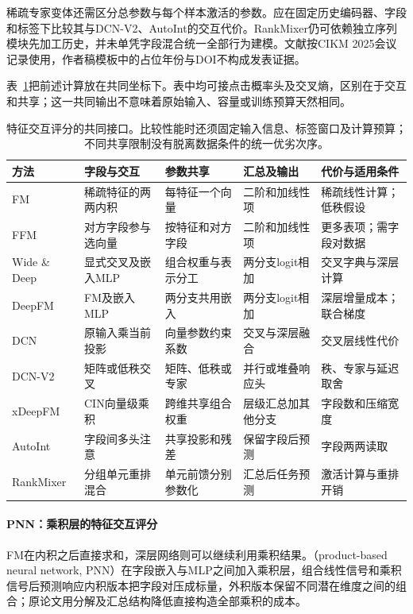 稀疏专家变体还需区分总参数与每个样本激活的参数。应在固定历史编码器、字段和标签下比较其与DCN-V2、AutoInt的交互代价。RankMixer仍可依赖独立序列模块先加工历史，并未单凭字段混合统一全部行为建模。文献按CIKM 2025会议记录使用，作者稿模板中的占位年份与DOI不构成发表证据。

表~\ref{tab:rs-feature-models}把前述计算放在共同坐标下。表中均可接点击概率头及交叉熵，区别在于交互和共享；这一共同输出不意味着原始输入、容量或训练预算天然相同。
\begin{table}[htbp]
 \centering\small
 \begin{tabularx}{\linewidth}{@{}lXXXX@{}}
 \toprule
 方法 & 字段与交互 & 参数共享 & 汇总及输出 & 代价与适用条件\\
 \midrule
 FM & 稀疏特征的两两内积 & 每特征一个向量 & 二阶和加线性项 & 稀疏线性计算；低秩假设\\
 FFM & 对方字段参与选向量 & 按特征和对方字段 & 二阶和加线性项 & 更多表项；需字段对数据\\
 Wide \& Deep & 显式交叉及嵌入MLP & 组合权重与表示分工 & 两分支logit相加 & 交叉字典与深层计算\\
 DeepFM & FM及嵌入MLP & 两分支共用嵌入 & 两分支logit相加 & 深层增量成本；联合梯度\\
 DCN & 原输入乘当前投影 & 向量参数约束系数 & 交叉与深层融合 & 交叉层线性代价\\
 DCN-V2 & 矩阵或低秩交叉 & 矩阵、低秩或专家 & 并行或堆叠响应头 & 秩、专家与延迟取舍\\
 xDeepFM & CIN向量级乘积 & 跨维共享组合权重 & 层级汇总加其他分支 & 字段数和压缩宽度\\
 AutoInt & 字段间多头注意 & 共享投影和残差 & 保留字段后预测 & 字段两两读取\\
 RankMixer & 分组单元重排混合 & 单元前馈分别参数化 & 汇总后任务预测 & 激活计算与重排开销\\
 \bottomrule
 \end{tabularx}
 \caption{特征交互评分的共同接口。比较性能时还须固定输入信息、标签窗口及计算预算；不同共享限制没有脱离数据条件的统一优劣次序。}
 \label{tab:rs-feature-models}
\end{table}

\paragraph{PNN：乘积层的特征交互评分}
\label{sec:rs-pnn}

FM在内积之后直接求和，深层网络则可以继续利用乘积结果。（product-based neural network, PNN）在字段嵌入与MLP之间加入乘积层，组合线性信号和乘积信号后预测响应内积版本把字段对压成标量，外积版本保留不同潜在维度之间的组合；原论文用分解及汇总结构降低直接构造全部乘积的成本。

